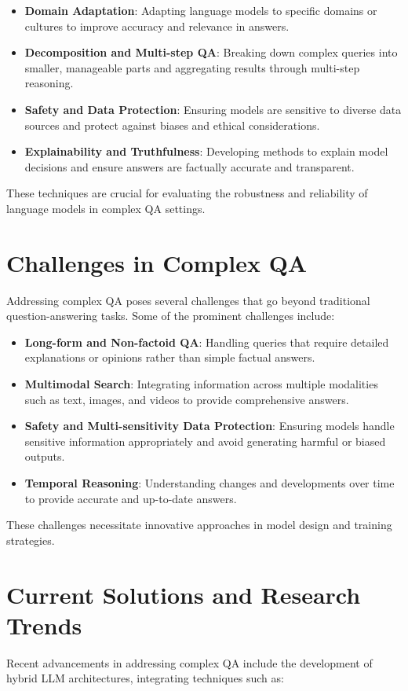 \documentclass{article}
\begin{document}
\begin{itemize}
    \item \textbf{Domain Adaptation}: Adapting language models to specific domains or cultures to improve accuracy and relevance in answers.
    \item \textbf{Decomposition and Multi-step QA}: Breaking down complex queries into smaller, manageable parts and aggregating results through multi-step reasoning.
    \item \textbf{Safety and Data Protection}: Ensuring models are sensitive to diverse data sources and protect against biases and ethical considerations.
    \item \textbf{Explainability and Truthfulness}: Developing methods to explain model decisions and ensure answers are factually accurate and transparent.
\end{itemize}

These techniques are crucial for evaluating the robustness and reliability of language models in complex QA settings.

\section{Challenges in Complex QA}
Addressing complex QA poses several challenges that go beyond traditional question-answering tasks. Some of the prominent challenges include:

\begin{itemize}
    \item \textbf{Long-form and Non-factoid QA}: Handling queries that require detailed explanations or opinions rather than simple factual answers.
    \item \textbf{Multimodal Search}: Integrating information across multiple modalities such as text, images, and videos to provide comprehensive answers.
    \item \textbf{Safety and Multi-sensitivity Data Protection}: Ensuring models handle sensitive information appropriately and avoid generating harmful or biased outputs.
    \item \textbf{Temporal Reasoning}: Understanding changes and developments over time to provide accurate and up-to-date answers.
\end{itemize}

These challenges necessitate innovative approaches in model design and training strategies.

\section{Current Solutions and Research Trends}
Recent advancements in addressing complex QA include the development of hybrid LLM architectures, integrating techniques such as:
\end{document}
